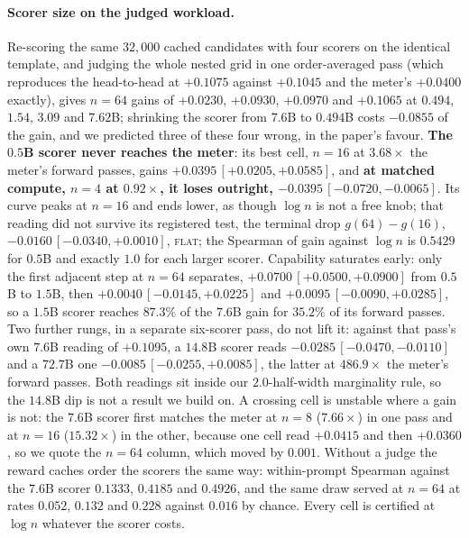 \paragraph{Scorer size on the judged workload.}\label{app:frontier}\label{app:saturation}
Re-scoring the same $32{,}000$ cached candidates with four scorers on the identical template, and
judging the whole nested grid in one order-averaged pass (which reproduces the head-to-head at
$+0.1075$ against $+0.1045$ and the meter's $+0.0400$ exactly), gives $n=64$ gains of $+0.0230$,
$+0.0930$, $+0.0970$ and $+0.1065$ at $0.494$, $1.54$, $3.09$ and $7.62$B; shrinking the scorer from
$7.6$B to $0.494$B costs $-0.0855$ of the gain, and we predicted three of these four wrong, in the paper's
favour. \textbf{The $0.5$B scorer never
reaches the meter}: its best cell, $n=16$ at $3.68\times$ the meter's forward passes, gains
$+0.0395\,[+0.0205,+0.0585]$, and \textbf{at matched compute, $n=4$ at $0.92\times$, it loses outright,
$-0.0395\,[-0.0720,-0.0065]$}. Its curve peaks at $n=16$ and ends lower, as though $\log n$ is not a free knob; that
reading did not survive its registered test, the terminal drop $g(64)-g(16)$, $-0.0160\,[-0.0340,+0.0010]$,
\textsc{flat}; the Spearman of gain against $\log n$ is $0.5429$ for $0.5$B and exactly $1.0$ for each
larger scorer. Capability saturates early: only the first adjacent step at $n=64$ separates,
$+0.0700\,[+0.0500,+0.0900]$ from $0.5$B to $1.5$B, then $+0.0040\,[-0.0145,+0.0225]$ and
$+0.0095\,[-0.0090,+0.0285]$, so a $1.5$B scorer reaches $87.3\%$ of the $7.6$B gain for $35.2\%$ of its
forward passes. Two further rungs, in a separate six-scorer pass, do not lift it: against that pass's
own $7.6$B reading of $+0.1095$, a $14.8$B scorer reads $-0.0285\,[-0.0470,-0.0110]$ and a $72.7$B one
$-0.0085\,[-0.0255,+0.0085]$, the latter at $486.9\times$ the meter's forward passes. Both readings sit inside our $2.0$-half-width marginality rule, so the $14.8$B dip is not a result we build on. A crossing cell is
unstable where a gain is not: the $7.6$B scorer first matches the meter at $n=8$ ($7.66\times$) in one
pass and at $n=16$ ($15.32\times$) in the other, because one cell read $+0.0415$ and then $+0.0360$, so
we quote the $n=64$ column, which moved by $0.001$. Without a judge the reward caches order the scorers
the same way: within-prompt Spearman against the $7.6$B scorer $0.1333$, $0.4185$ and $0.4926$, and the
same draw served at $n=64$ at rates $0.052$, $0.132$ and $0.228$ against $0.016$ by chance. Every cell is
certified at $\log n$ whatever the scorer costs.

